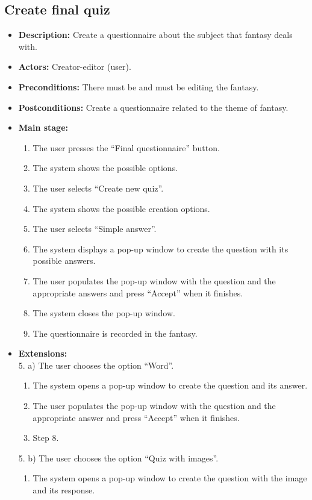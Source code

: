 \subsection{Create final quiz}
\begin{itemize}
	\item \textbf{Description:} Create a questionnaire about the subject that fantasy deals with.
	\item \textbf{Actors:} Creator-editor (user).
	\item \textbf{Preconditions:} There must be and must be editing the fantasy.
	\item \textbf{Postconditions:} Create a questionnaire related to the theme of fantasy.
	\item \textbf{Main stage:}
	\begin{enumerate}
		\item The user presses the ``Final questionnaire'' button.
		\item The system shows the possible options.
		\item The user selects ``Create new quiz''.
		\item The system shows the possible creation options.
		\item The user selects ``Simple answer''.
		\item The system displays a pop-up window to create the question with its possible answers.
		\item The user populates the pop-up window with the question and the appropriate answers and press ``Accept'' when it finishes.
		\item The system closes the pop-up window.
		\item The questionnaire is recorded in the fantasy.
	\end{enumerate}
	\item \textbf{Extensions:} \\5. a) The user chooses the option ``Word''.
	\begin{enumerate}
		\item The system opens a pop-up window to create the question and its answer.
		\item The user populates the pop-up window with the question and the appropriate answer and press ``Accept'' when it finishes.
		\item Step 8.
	\end{enumerate}
	5. b) The user chooses the option ``Quiz with images''.
	\begin{enumerate}
		\item The system opens a pop-up window to create the question with the image and its response.

\end{enumerate}
\end{itemize}

